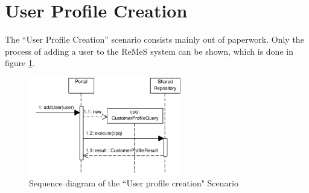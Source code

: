 \section{User Profile Creation}
\label{scenario:user-profile-creation}

\npar The ``User Profile Creation'' scenario consists mainly out of paperwork.
Only the process of adding a user to the ReMeS system can be shown, which is
done in figure \ref{fig:scenario-5-1}.

\begin{figure}[H]
	\begin{centering}
		\includegraphics[width=0.6\textwidth]{figs/scenario-5-1.pdf}
		\caption{Sequence diagram of the ``User profile creation" Scenario}
		\label{fig:scenario-5-1}
	\end{centering}
\end{figure}

